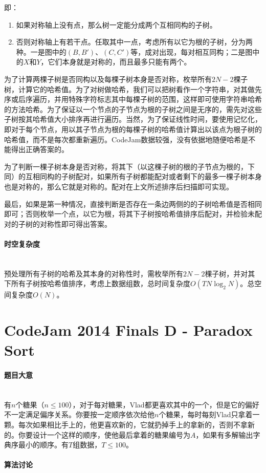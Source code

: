 \documentclass[UTF8]{ctexart}
\newcommand{\myparagraph}[1]{\paragraph{#1}\mbox{}\\}
\theoremstyle{nonumberplain}
\begin{document}
			即：
		
			\begin{enumerate}
				\item 如果对称轴上没有点，那么树一定能分成两个互相同构的子树。
				\item 否则对称轴上有若干点。任取其中一点，考虑所有以它为根的子树，分为两种。一是图中的$(B,B')$、$(C,C')$等，成对出现，每对相互同构；二是图中的$X$和$Y$，它们本身就是对称的，而且最多只能有两个。
			\end{enumerate}
			
			为了计算两棵子树是否同构以及每棵子树本身是否对称，枚举所有$2N-2$棵子树，计算它的哈希值。为了对树做哈希，我们可以把树看作一个字符串，对其做先序或后序遍历，并用特殊字符标志其中每棵子树的范围，这样即可使用字符串哈希的方法哈希。为了保证以一个节点的子节点为根的子树之间是无序的，需先对这些子树按其哈希值大小排序再进行遍历。当然，为了保证线性时间，要使用记忆化，即对于每个节点，用以其子节点为根的每棵子树的哈希值计算出以该点为根子树的哈希值，而不是每次都重新遍历。CodeJam数据较强，没有依据地随便哈希是不能得出正确答案的。
			
			为了判断一棵子树本身是否对称，将其下（以这棵子树的根的子节点为根的，下同）的互相同构的子树配对，如果所有子树都能配对或者剩下的最多一棵子树本身也是对称的，那么它就是对称的。配对在上文所述排序后扫描即可实现。
			
			最后，如果是第一种情况，直接判断是否存在一条边两侧的的子树哈希值是否相同即可；否则枚举一个点，以它为根，将其下子树按哈希值排序后配对，并检验未配对的子树的对称性即可得出答案。
		
		\myparagraph{时空复杂度}
	
			预处理所有子树的哈希及其本身的对称性时，需枚举所有$2N-2$棵子树，并对其下所有子树按哈希值排序，考虑上数据组数，总时间复杂度$O(TN\log_2N)$。总空间复杂度$O(N)$。
	
	\section{CodeJam 2014 Finals D - Paradox Sort}
	
		\myparagraph{题目大意}
		
			有$n$个糖果（$n \leq 100$），对于每对糖果，Vlad都更喜欢其中的一个，但是它的偏好不一定满足偏序关系。你要按一定顺序依次给他$n$个糖果，每时每刻Vlad只拿着一颗。每次如果相比手上的，他更喜欢新的，它就扔掉手上的拿新的，否则不拿新的。你要设计一个这样的顺序，使他最后拿着的糖果编号为$A$，如果有多解输出字典序最小的顺序。有$T$组数据，$T \leq 100$。
		
		\myparagraph{算法讨论}
		
\end{document}
